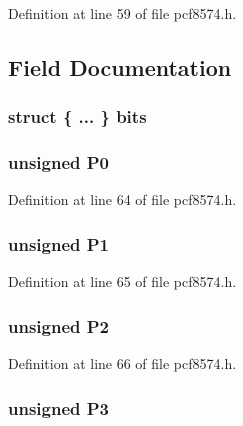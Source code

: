 Definition at line 59 of file pcf8574.\-h.



\subsection{Field Documentation}
\hypertarget{union_p_c_f8574__t_a5f733cca3c2a08f19abf904562e56b7d}{
\subsubsection[{bits}]{\setlength{\rightskip}{0pt plus 5cm}struct \{ ... \}   bits}}\label{union_p_c_f8574__t_a5f733cca3c2a08f19abf904562e56b7d}
\hypertarget{union_p_c_f8574__t_a9e4cb49a5e93d50ae3a30b7c6488aa6b}{
\subsubsection[{P0}]{\setlength{\rightskip}{0pt plus 5cm}unsigned P0}}\label{union_p_c_f8574__t_a9e4cb49a5e93d50ae3a30b7c6488aa6b}


Definition at line 64 of file pcf8574.\-h.

\hypertarget{union_p_c_f8574__t_a906a662bcac1c1443ea857761f41500e}{
\subsubsection[{P1}]{\setlength{\rightskip}{0pt plus 5cm}unsigned P1}}\label{union_p_c_f8574__t_a906a662bcac1c1443ea857761f41500e}


Definition at line 65 of file pcf8574.\-h.

\hypertarget{union_p_c_f8574__t_a4a03007ff6fe61dc33f5e37e0390fe97}{
\subsubsection[{P2}]{\setlength{\rightskip}{0pt plus 5cm}unsigned P2}}\label{union_p_c_f8574__t_a4a03007ff6fe61dc33f5e37e0390fe97}


Definition at line 66 of file pcf8574.\-h.

\hypertarget{union_p_c_f8574__t_ac74f90ee94cbedbce61fae5a3c272269}{
\subsubsection[{P3}]{\setlength{\rightskip}{0pt plus 5cm}unsigned P3}}\label{union_p_c_f8574__t_ac74f90ee94cbedbce61fae5a3c272269}


